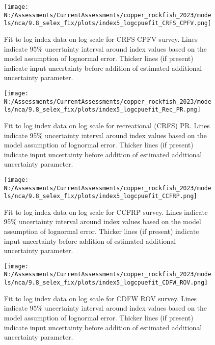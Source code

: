 \documentclass[11pt,
  english,
  letterpaper,
]{article}
\begin{document}
\pagebreak

\begin{figure}
\centering
\texttt{[image: N:/Assessments/CurrentAssessments/copper\_rockfish\_2023/models/nca/9.8\_selex\_fix/plots/index5\_logcpuefit\_CRFS\_CPFV.png]}
\caption{Fit to log index data on log scale for CRFS CPFV survey. Lines indicate 95\% uncertainty interval around index values based on the model assumption of lognormal error. Thicker lines (if present) indicate input uncertainty before addition of estimated additional uncertainty parameter.\label{fig:crfs-cpfv-index-fit}}
\end{figure}

\pagebreak

\begin{figure}
\centering
\texttt{[image: N:/Assessments/CurrentAssessments/copper\_rockfish\_2023/models/nca/9.8\_selex\_fix/plots/index5\_logcpuefit\_Rec\_PR.png]}
\caption{Fit to log index data on log scale for recreational (CRFS) PR. Lines indicate 95\% uncertainty interval around index values based on the model assumption of lognormal error. Thicker lines (if present) indicate input uncertainty before addition of estimated additional uncertainty parameter.\label{fig:crfs-pr-index-fit}}
\end{figure}

\pagebreak

\begin{figure}
\centering
\texttt{[image: N:/Assessments/CurrentAssessments/copper\_rockfish\_2023/models/nca/9.8\_selex\_fix/plots/index5\_logcpuefit\_CCFRP.png]}
\caption{Fit to log index data on log scale for CCFRP survey. Lines indicate 95\% uncertainty interval around index values based on the model assumption of lognormal error. Thicker lines (if present) indicate input uncertainty before addition of estimated additional uncertainty parameter.\label{fig:ccfrp-index-fit}}
\end{figure}

\pagebreak

\begin{figure}
\centering
\texttt{[image: N:/Assessments/CurrentAssessments/copper\_rockfish\_2023/models/nca/9.8\_selex\_fix/plots/index5\_logcpuefit\_CDFW\_ROV.png]}
\caption{Fit to log index data on log scale for CDFW ROV survey. Lines indicate 95\% uncertainty interval around index values based on the model assumption of lognormal error. Thicker lines (if present) indicate input uncertainty before addition of estimated additional uncertainty parameter.\label{fig:rov-index-fit}}
\end{figure}
\end{document}
